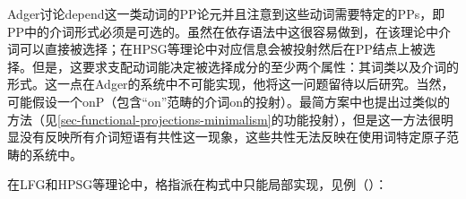 Adger讨论depend这一类动词的PP论元并且注意到这些动词需要特定的PPs，即PP中的介词形式必须是可选的。虽然在依存语法中这很容易做到，在该理论中介词可以直接被选择；在HPSG等理论中对应信息会被投射然后在PP结点上被选择。但是，这要求支配动词能决定被选择成分的至少两个属性：其词类以及介词的形式。这一点在Adger的系统中不可能实现，他将这一问题留待以后研究。当然，可能假设一个onP（包含“on”范畴的介词on的投射）。最简方案中也提出过类似的方法（见\ref{sec-functional-projections-minimalism}的功能投射），但是这一方法很明显没有反映所有介词短语有共性这一现象，这些共性无法反映在使用词特定原子范畴的系统中。

在LFG\indexlfg 和HPSG\indexhpsg 等理论中，格指派在构式中只能局部实现，见例（）：

